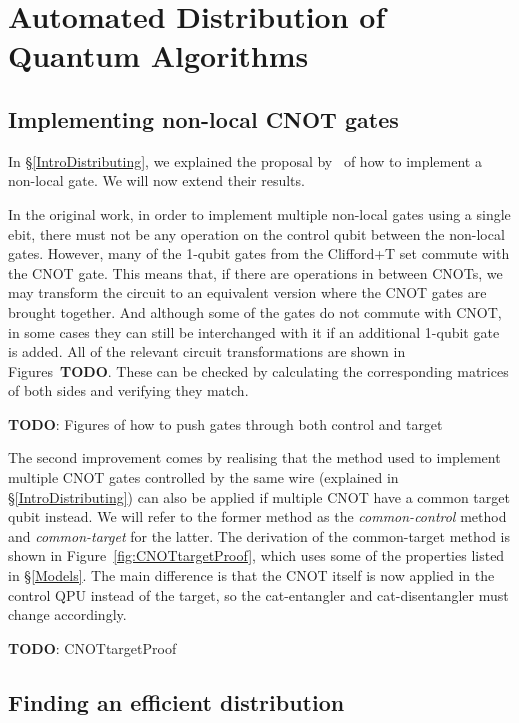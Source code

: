 \chapter{Automated Distribution of Quantum Algorithms}
\label{chap:Project}

\section{Implementing non-local CNOT gates}
\label{NonLocalGates}

In \S\ref{IntroDistributing}, we explained the proposal by~\citet{NonLocalCNOT} of how to implement a non-local gate. We will now extend their results.

In the original work, in order to implement multiple non-local gates using a single ebit, there must not be any operation on the control qubit between the non-local gates. However, many of the 1-qubit gates from the Clifford+T set commute with the CNOT gate. This means that, if there are operations in between CNOTs, we may transform the circuit to an equivalent version where the CNOT gates are brought together. And although some of the gates do not commute with CNOT, in some cases they can still be interchanged with it if an additional 1-qubit gate is added. All of the relevant circuit transformations are shown in Figures~\textbf{TODO}. These can be checked by calculating the corresponding matrices of both sides and verifying they match.

\textbf{TODO}: Figures of how to push gates through both control and target

The second improvement comes by realising that the method used to implement multiple CNOT gates controlled by the same wire (explained in \S\ref{IntroDistributing}) can also be applied if multiple CNOT have a common target qubit instead. We will refer to the former method as the \textit{common-control} method and \textit{common-target} for the latter. The derivation of the common-target method is shown in Figure~\ref{fig:CNOTtargetProof}, which uses some of the properties listed in \S\ref{Models}. The main difference is that the CNOT itself is now applied in the control QPU instead of the target, so the cat-entangler and cat-disentangler must change accordingly.

\textbf{TODO}: CNOTtargetProof


\section{Finding an efficient distribution}
\label{EfficientDistrib}

